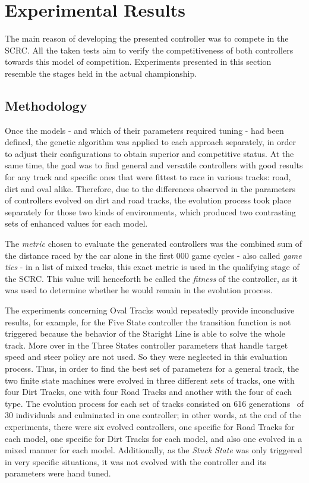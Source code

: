 \section{Experimental Results} \label{sec:Experiments}

	The main reason of developing the presented controller was to compete in the SCRC. All the taken tests aim to verify the competitiveness of both controllers towards this model of competition. Experiments presented in this section resemble the stages held in the actual championship.
\subsection{Methodology} \label{subsec:Methodology}

	Once the models - and which of their parameters required tuning - had been defined, the genetic algorithm was applied to each approach separately, in order to adjust their configurations to obtain superior and competitive status. At the same time, the goal was to find general and versatile controllers with good results for any track and specific ones that were fittest to race in various tracks: road, dirt and oval alike. Therefore, due to the differences observed in the parameters of controllers evolved on dirt and road tracks, the evolution process took place separately for those two kinds of environments, which produced two contrasting sets of enhanced values for each model.
	
	The \emph{metric} chosen to evaluate the generated controllers was the combined sum of the distance raced by the car alone in the first  000 game cycles - also called \emph{game tics} - in a list of mixed tracks, this exact metric is used in the qualifying stage of the SCRC. This value will henceforth be called the \emph{fitness} of the controller, as it was used to determine whether he would remain in the evolution process.
	
	The experiments concerning Oval Tracks would repeatedly provide
	inconclusive results, for example, for the Five State controller the
	transition function is not triggered because the behavior of the Staright Line is able to solve the whole track. More over
	in the Three States controller parameters that handle target speed and steer policy are not used.
	So they were neglected in this evaluation process. Thus, in order to find the best set of parameters for a general track, the two finite state machines were evolved in three different sets of tracks, one with four Dirt Tracks, one with four Road Tracks and another with the four of each type. The evolution process for each set of tracks consisted on 616 generations~\cite{218485} of 30 individuals and culminated in one controller; in other words, at the end of the experiments, there were six evolved controllers, one specific for Road Tracks for each model, one specific for Dirt Tracks for each model, and also one evolved in a mixed manner for each model. Additionally, as the \emph{Stuck State} was only triggered in very specific situations, it was not evolved with the controller and its parameters were hand tuned.
	
